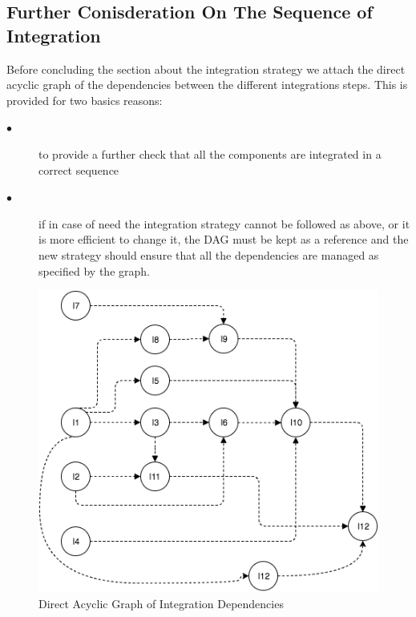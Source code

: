 \documentclass[a4paper,10pt]{article}
\begin{document}
\subsection{Further Conisderation On The Sequence of Integration}
Before concluding the section about the integration strategy we attach the direct acyclic graph of the dependencies between the different
integrations steps. This is provided
for two basics reasons: 
\begin{description}
    \item[$\bullet$] to provide a further check that all the components are integrated in a correct sequence 
    \item[$\bullet$] if in case of need the integration strategy cannot be followed as above, or it is more efficient to change it, 
the DAG must be kept as a reference
and the new strategy should ensure that all the dependencies are managed as specified by the graph.
  \end{description}
  \begin{figure}[!h]
  \centering
    \includegraphics[scale=0.8]{Resources/dagdependencies.png}
    \caption{Direct Acyclic Graph of Integration Dependencies}
  \end{figure}
  \clearpage
\end{document}
